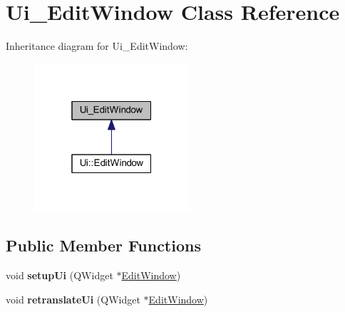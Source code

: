 \hypertarget{class_ui___edit_window}{}\section{Ui\+\_\+\+Edit\+Window Class Reference}
\label{class_ui___edit_window}


Inheritance diagram for Ui\+\_\+\+Edit\+Window\+:\nopagebreak
\begin{figure}[H]
\begin{center}
\leavevmode
\includegraphics[width=163pt]{class_ui___edit_window__inherit__graph}
\end{center}
\end{figure}
\subsection*{Public Member Functions}
\begin{DoxyCompactItemize}
\item 
\mbox{\label{class_ui___edit_window_a73e4228c854ad2e662f738054844fdc3}} 
void {\bfseries setup\+Ui} (Q\+Widget $\ast$\mbox{\hyperlink{class_edit_window}{Edit\+Window}})
\item 
\mbox{\label{class_ui___edit_window_a49415a0f0f9abdd22402b5adb5970a0f}} 
void {\bfseries retranslate\+Ui} (Q\+Widget $\ast$\mbox{\hyperlink{class_edit_window}{Edit\+Window}})
\end{DoxyCompactItemize}
